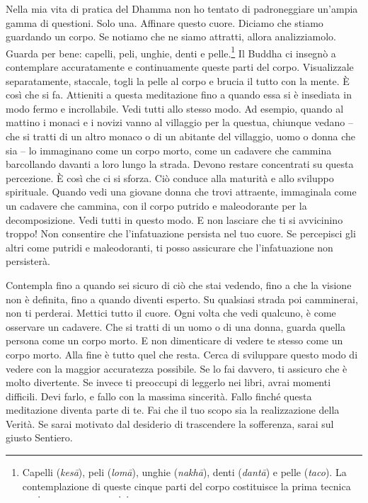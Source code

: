 Nella mia vita di pratica del Dhamma non ho tentato di padroneggiare
un'ampia gamma di questioni. Solo una. Affinare questo cuore. Diciamo
che stiamo guardando un corpo. Se notiamo che ne siamo attratti, allora
analizziamolo. Guarda per bene: capelli, peli, unghie, denti e
pelle.\footnote{Capelli (\emph{kesā}), peli (\emph{lomā}), unghie
  (\emph{nakhā}), denti (\emph{dantā}) e pelle (\emph{taco}). La
  contemplazione di queste cinque parti del corpo costituisce la prima
  tecnica meditativa insegnata dal precettore a un monaco o a una monaca
  appena ordinati.} Il Buddha ci insegnò a contemplare accuratamente e
continuamente queste parti del corpo. Visualizzale separatamente,
staccale, togli la pelle al corpo e brucia il tutto con la mente. È così
che si fa. Attieniti a questa meditazione fino a quando essa si è
insediata in modo fermo e incrollabile. Vedi tutti allo stesso modo. Ad
esempio, quando al mattino i monaci e i novizi vanno al villaggio per la
questua, chiunque vedano -- che si tratti di un altro monaco o di un
abitante del villaggio, uomo o donna che sia -- lo immaginano come un
corpo morto, come un cadavere che cammina barcollando davanti a loro
lungo la strada. Devono restare concentrati su questa percezione. È così
che ci si sforza. Ciò conduce alla maturità e allo sviluppo spirituale.
Quando vedi una giovane donna che trovi attraente, immaginala come un
cadavere che cammina, con il corpo putrido e maleodorante per la
decomposizione. Vedi tutti in questo modo. E non lasciare che ti si
avvicinino troppo! Non consentire che l'infatuazione persista nel tuo
cuore. Se percepisci gli altri come putridi e maleodoranti, ti posso
assicurare che l'infatuazione non persisterà.

Contempla fino a quando sei sicuro di ciò che stai vedendo, fino a che
la visione non è definita, fino a quando diventi esperto. Su qualsiasi
strada poi camminerai, non ti perderai. Mettici tutto il cuore. Ogni
volta che vedi qualcuno, è come osservare un cadavere. Che si tratti di
un uomo o di una donna, guarda quella persona come un corpo morto. E non
dimenticare di vedere te stesso come un corpo morto. Alla fine è tutto
quel che resta. Cerca di sviluppare questo modo di vedere con la maggior
accuratezza possibile. Se lo fai davvero, ti assicuro che è molto
divertente. Se invece ti preoccupi di leggerlo nei libri, avrai momenti
difficili. Devi farlo, e fallo con la massima sincerità. Fallo finché
questa meditazione diventa parte di te. Fai che il tuo scopo sia la
realizzazione della Verità. Se sarai motivato dal desiderio di
trascendere la sofferenza, sarai sul giusto Sentiero.

